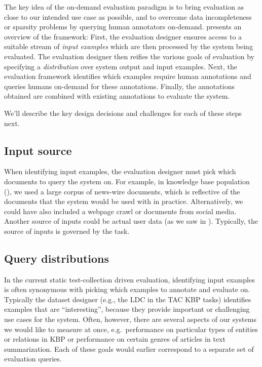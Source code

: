 The key idea of the on-demand evaluation paradigm is to bring evaluation as close to our intended use case as possible, and to overcome data incompleteness or sparsity problems by querying human annotators on-demand.
 presents an overview of the framework: 
First, the evaluation designer ensures access to a suitable stream of \textit{input examples}
which are then processed by the system being evaluated.
The evaluation designer then reifies the various goals of evaluation by specifying a \textit{distribution} over system output and input examples.
Next, the evaluation framework identifies which examples require human annotations and queries humans on-demand for these annotations. 
Finally, the annotations obtained are combined with existing annotations to evaluate the system.

We'll describe the key design decisions and challenges for each of these steps next.

\subsection{Input source}
When identifying input examples, the evaluation designer must pick which documents to query the system on.
For example, in knowledge base population (), we used a large corpus of news-wire documents, which is reflective of the documents that the system would be used with in practice.
Alternatively, we could have also included a webpage crawl or documents from social media.
Another source of inputs could be actual user data (as we saw in ).
Typically, the source of inputs is governed by the task.

\subsection{Query distributions}
In the current static test-collection driven evaluation, identifying input examples is often synonymous with picking which examples to annotate and evaluate on.
Typically the dataset designer (e.g., the LDC in the TAC KBP tasks) identifies examples that are ``interesting'', because they provide important or challenging use cases for the system.
Often, however, there are several aspects of our systems we would like to measure at once, e.g.\ performance on particular types of entities or relations in KBP or performance on certain genres of articles in text summarization.
Each of these goals would earlier correspond to a separate set of evaluation queries. 


